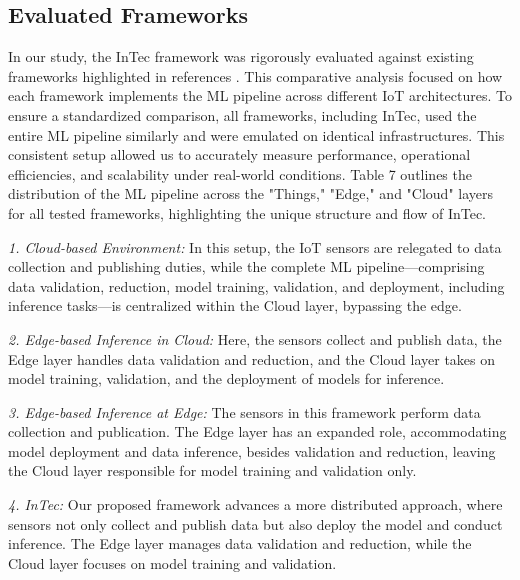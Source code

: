 \documentclass[11pt]{article}
\begin{document}
	\subsection{Evaluated Frameworks}
	In our study, the InTec framework was rigorously evaluated against existing frameworks highlighted in references \cite{c15, c16, c17}. This comparative analysis focused on how each framework implements the ML pipeline across different IoT architectures. To ensure a standardized comparison, all frameworks, including InTec, used the entire ML pipeline similarly and were emulated on identical infrastructures. This consistent setup allowed us to accurately measure performance, operational efficiencies, and scalability under real-world conditions. Table 7 outlines the distribution of the ML pipeline across the "Things," "Edge," and "Cloud" layers for all tested frameworks, highlighting the unique structure and flow of InTec.
	
	\textit{1. Cloud-based Environment:} In this setup, the IoT sensors are relegated to data collection and publishing duties, while the complete ML pipeline—comprising data validation, reduction, model training, validation, and deployment, including inference tasks—is centralized within the Cloud layer, bypassing the edge.
	
	\textit{2. Edge-based Inference in Cloud:} Here, the sensors collect and publish data, the Edge layer handles data validation and reduction, and the Cloud layer takes on model training, validation, and the deployment of models for inference.
	
	\textit{3. Edge-based Inference at Edge:} The sensors in this framework perform data collection and publication. The Edge layer has an expanded role, accommodating model deployment and data inference, besides validation and reduction, leaving the Cloud layer responsible for model training and validation only.
	
	\textit{4. InTec:} Our proposed framework advances a more distributed approach, where sensors not only collect and publish data but also deploy the model and conduct inference. The Edge layer manages data validation and reduction, while the Cloud layer focuses on model training and validation.
	
	
	
\end{document}
